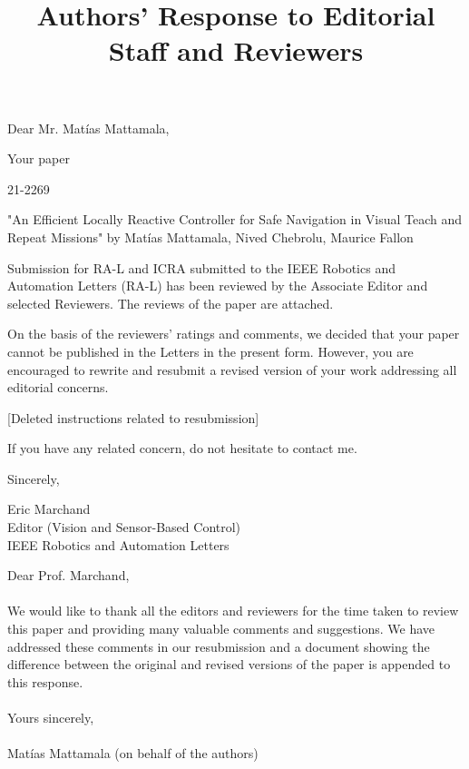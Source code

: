 \documentclass[a4paper,11pt]{article}
\title{Authors' Response to Editorial Staff and Reviewers}
\author{}
\date{}
\begin{document}
\maketitle
\vspace{-5ex}

\begin{displayquote}
Dear Mr. Mat\'ias Mattamala,

Your paper

21-2269

"An Efficient Locally Reactive Controller for Safe Navigation in Visual
Teach and Repeat Missions" by Mat\'ias Mattamala, Nived Chebrolu, Maurice Fallon

Submission for RA-L and ICRA submitted to the IEEE Robotics and Automation 
Letters (RA-L) has been reviewed by the Associate Editor and selected 
Reviewers. The reviews of the paper are attached.

On the basis of the reviewers' ratings and comments, we decided that your paper 
cannot be published in the Letters in the present form. 
However, you are encouraged to rewrite and resubmit a revised version
of your work addressing all editorial concerns.

[Deleted instructions related to resubmission]

If you have any related concern, do not hesitate to contact me.

Sincerely,

Eric Marchand\\
Editor (Vision and Sensor-Based Control)\\
IEEE Robotics and Automation Letters
\end{displayquote}

Dear Prof. Marchand,\\
\\
We would like to thank all the editors and reviewers for the time taken 
to review this paper and providing many valuable comments and suggestions.
We have addressed these comments in our resubmission and a 
document showing the difference between the original and revised versions of 
the paper is appended to this response.\\
\\
Yours sincerely,\\
\\
Mat\'ias Mattamala (on behalf of the authors)

\end{document}
